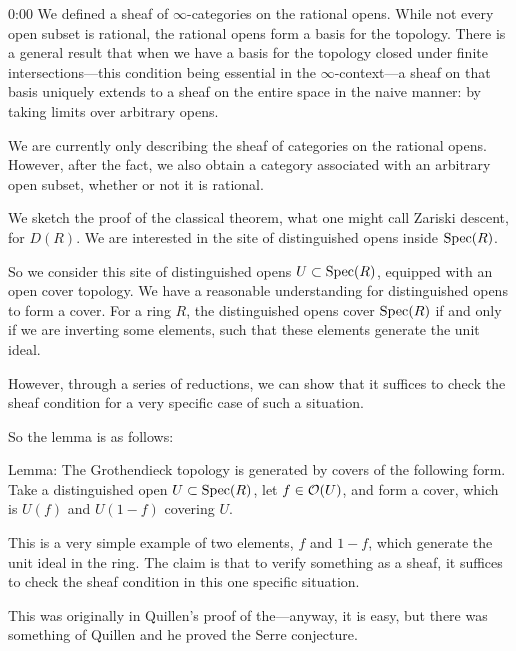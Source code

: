 \begin{unfinished}{0:00}
We defined a sheaf of $\infty$-categories on the rational opens. While not every open subset is rational, the rational opens form a basis for the topology. There is a general result that when we have a basis for the topology closed under finite intersections---this condition being essential in the $\infty$-context---a sheaf on that basis uniquely extends to a sheaf on the entire space in the naive manner: by taking limits over arbitrary opens.

We are currently only describing the sheaf of categories on the rational opens. However, after the fact, we also obtain a category associated with an arbitrary open subset, whether or not it is rational.

\begin{sketch}
We sketch the proof of the classical theorem, what one might call Zariski descent, for $D(R)$. We are interested in the site of distinguished opens inside $\operatorname{Spec}(R)$. 

So we consider this site of distinguished opens $U \subset \operatorname{Spec}(R)$, equipped with an open cover topology. We have a reasonable understanding for distinguished opens to form a cover. For a ring $R$, the distinguished opens cover $\operatorname{Spec}(R)$ if and only if we are inverting some elements, such that these elements generate the unit ideal.

However, through a series of reductions, we can show that it suffices to check the sheaf condition for a very specific case of such a situation.

So the lemma is as follows:

Lemma: The Grothendieck topology is generated by covers of the following form.
Take a distinguished open $U \subset \operatorname{Spec}(R)$, let $f \in \mathcal O(U)$, and form a cover, which is 
$U(f)$ and $U(1-f)$ covering $U$.


\end{sketch}

This is a very simple example of two elements, $f$ and $1-f$, which generate the unit ideal in the ring. The claim is that to verify something as a sheaf, it suffices to check the sheaf condition in this one specific situation. 

\gabber This was originally in Quillen's proof of the---anyway, it is easy, but there was something of Quillen and he proved the Serre conjecture.



\end{unfinished}
